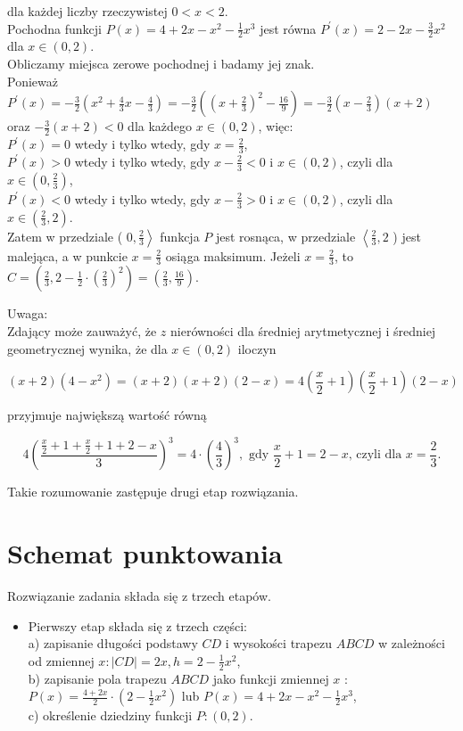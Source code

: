 \documentclass[10pt]{article}
\begin{document}
dla każdej liczby rzeczywistej $0<x<2$.\\
Pochodna funkcji $P(x)=4+2 x-x^{2}-\frac{1}{2} x^{3}$ jest równa $P^{\prime}(x)=2-2 x-\frac{3}{2} x^{2}$ dla $x \in(0,2)$.\\
Obliczamy miejsca zerowe pochodnej i badamy jej znak.\\
Ponieważ $P^{\prime}(x)=-\frac{3}{2}\left(x^{2}+\frac{4}{3} x-\frac{4}{3}\right)=-\frac{3}{2}\left(\left(x+\frac{2}{3}\right)^{2}-\frac{16}{9}\right)=-\frac{3}{2}\left(x-\frac{2}{3}\right)(x+2)$\\
oraz $-\frac{3}{2}(x+2)<0$ dla każdego $x \in(0,2)$, więc:\\
$P^{\prime}(x)=0$ wtedy i tylko wtedy, gdy $x=\frac{2}{3}$,\\
$P^{\prime}(x)>0$ wtedy i tylko wtedy, gdy $x-\frac{2}{3}<0$ i $x \in(0,2)$, czyli dla $x \in\left(0, \frac{2}{3}\right)$,\\
$P^{\prime}(x)<0$ wtedy i tylko wtedy, gdy $x-\frac{2}{3}>0$ i $x \in(0,2)$, czyli dla $x \in\left(\frac{2}{3}, 2\right)$.\\
Zatem w przedziale ( $\left.0, \frac{2}{3}\right\rangle$ funkcja $P$ jest rosnąca, w przedziale $\left\langle\frac{2}{3}, 2\right.$ ) jest malejąca, a w punkcie $x=\frac{2}{3}$ osiąga maksimum. Jeżeli $x=\frac{2}{3}$, to $C=\left(\frac{2}{3}, 2-\frac{1}{2} \cdot\left(\frac{2}{3}\right)^{2}\right)=\left(\frac{2}{3}, \frac{16}{9}\right)$.

Uwaga:\\
Zdający może zauważyć, że $z$ nierówności dla średniej arytmetycznej i średniej geometrycznej wynika, że dla $x \in(0,2)$ iloczyn

$$
(x+2)\left(4-x^{2}\right)=(x+2)(x+2)(2-x)=4\left(\frac{x}{2}+1\right)\left(\frac{x}{2}+1\right)(2-x)
$$

przyjmuje największą wartość równą

$$
4\left(\frac{\frac{x}{2}+1+\frac{x}{2}+1+2-x}{3}\right)^{3}=4 \cdot\left(\frac{4}{3}\right)^{3}, \text { gdy } \frac{x}{2}+1=2-x \text {, czyli dla } x=\frac{2}{3} .
$$

Takie rozumowanie zastępuje drugi etap rozwiązania.

\section*{Schemat punktowania}
Rozwiązanie zadania składa się z trzech etapów.

\begin{itemize}
  \item Pierwszy etap składa się z trzech części:\\
a) zapisanie długości podstawy $C D$ i wysokości trapezu $A B C D$ w zależności od zmiennej $x:|C D|=2 x, h=2-\frac{1}{2} x^{2}$,\\
b) zapisanie pola trapezu $A B C D$ jako funkcji zmiennej $x$ : $P(x)=\frac{4+2 x}{2} \cdot\left(2-\frac{1}{2} x^{2}\right)$ lub $P(x)=4+2 x-x^{2}-\frac{1}{2} x^{3}$,\\
c) określenie dziedziny funkcji $P:(0,2)$.
\end{itemize}
\end{document}
